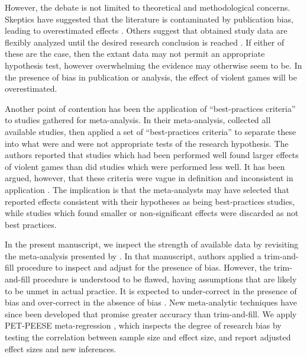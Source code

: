 \documentclass[man]{apa6}
\begin{document}
However, the debate is not limited to theoretical and methodological concerns.  
Skeptics have suggested that the literature is contaminated by publication bias, leading to overestimated effects \citep{Ferguson:2007a}. 
Others suggest that obtained study data are flexibly analyzed until the desired research conclusion is reached \citep{Elson:etal:2014;Ferguson:CITATION:NEEDED}. If either of these are the case, then the extant data may not permit an appropriate hypothesis test, however overwhelming the evidence may otherwise seem to be. In the presence of bias in publication or analysis, the effect of violent games will be overestimated.

Another point of contention has been the application of ``best-practices criteria'' to studies gathered for meta-analysis. In their meta-analysis, \citet{Anderson:etal:2010} collected all available studies, then applied a set of ``best-practices criteria'' to separate these into what were and were not appropriate tests of the research hypothesis. The authors reported that studies which had been performed well found larger effects of violent games than did studies which were performed less well. It has been argued, however, that these criteria were vague in definition and inconsistent in application \citep{Elson:Ferguson:2014,Ferguson:Kilburn:2010}. The implication is that the meta-analysts may have selected that reported effects consistent with their hypotheses as being best-practices studies, while studies which found smaller or non-significant effects were discarded as not best practices.

In the present manuscript, we inspect the strength of available data by revisiting the meta-analysis presented by \citet{Anderson:etal:2010}. In that manuscript, authors applied a trim-and-fill procedure \citep{Duval:Tweedie:2000} to inspect and adjust for the presence of bias. 
However, the trim-and-fill procedure is understood to be flawed, having assumptions that are likely to be unmet in actual practice. It is expected to under-correct in the presence of bias and over-correct in the absence of bias \citep{Peters:etal:2007,Simonsohn:DATACOLADAPOST}.
New meta-analytic techniques have since been developed that promise greater accuracy than trim-and-fill. We apply PET-PEESE meta-regression \citep{Stanley:Doucouliagos:2014}, which inspects the degree of research bias by testing the correlation between sample size and effect size, and report adjusted effect sizes and new inferences.
\end{document}
